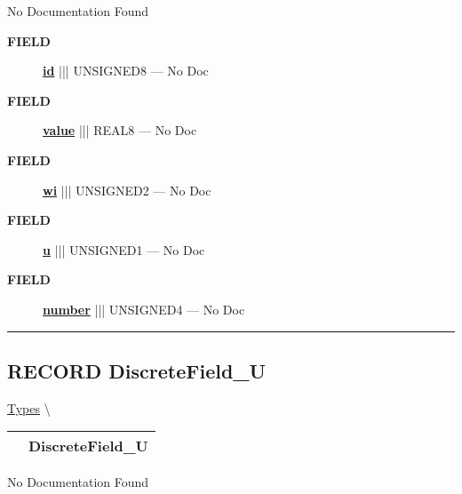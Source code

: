 \par





No Documentation Found







\par
\begin{description}
\item [\colorbox{tagtype}{\color{white} \textbf{\textsf{FIELD}}}] \textbf{\underline{id}} ||| UNSIGNED8 --- No Doc
\item [\colorbox{tagtype}{\color{white} \textbf{\textsf{FIELD}}}] \textbf{\underline{value}} ||| REAL8 --- No Doc
\item [\colorbox{tagtype}{\color{white} \textbf{\textsf{FIELD}}}] \textbf{\underline{wi}} ||| UNSIGNED2 --- No Doc
\item [\colorbox{tagtype}{\color{white} \textbf{\textsf{FIELD}}}] \textbf{\underline{u}} ||| UNSIGNED1 --- No Doc
\item [\colorbox{tagtype}{\color{white} \textbf{\textsf{FIELD}}}] \textbf{\underline{number}} ||| UNSIGNED4 --- No Doc
\end{description}





\rule{\linewidth}{0.5pt}
\subsection*{\textsf{\colorbox{headtoc}{\color{white} RECORD}
DiscreteField\_U}}

\hypertarget{ecldoc:logisticregression.types.discretefield_u}{}
\hspace{0pt} \hyperlink{ecldoc:LogisticRegression.Types}{Types} \textbackslash 

{\renewcommand{\arraystretch}{1.5}
\begin{tabularx}{\textwidth}{|>{\raggedright\arraybackslash}l|X|}
\hline
\hspace{0pt}\mytexttt{\color{red} } & \textbf{DiscreteField\_U} \\
\hline
\end{tabularx}
}

\par





No Documentation Found







